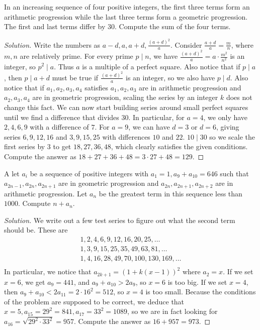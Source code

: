 \begin{prb}[2003 AIME I-8]
In an increasing sequence of four positive integers, the first three terms form
an arithmetic progression while the last three terms form a geometric
progression. The first and last terms differ by $30$. Compute the sum of the
four terms.
\end{prb}

\ifsolutions
\begin{proof}[Solution]
Write the numbers as $a - d, a, a + d, \frac{(a + d)^2}{a}$. Consider $\frac{a +
d}{a} = \frac{m}{n}$, where $m, n$ are relatively prime. For every prime $p \mid
n$, we have $\frac{(a + d)^2}{a} = a \cdot \frac{m^2}{n^2}$ is an integer, so
$p^2 \mid a$. Thus $a$ is a multiple of a perfect square. Also notice that if $p
\mid a$, then $p \mid a + d$ must be true if $\frac{(a + d)^2}{a}$ is an
integer, so we also have $p \mid d$. Also notice that if $a_1, a_2, a_3, a_4$
satisfies $a_1, a_2, a_3$ are in arithmetic progression and $a_2, a_3, a_4$ are
in geometric progression, scaling the series by an integer $k$ does not change
this fact. We can now start building series around small perfect squares until
we find a difference that divides $30$. In particular, for $a = 4$, we only have
$2, 4, 6, 9$ with a difference of $7$. For $a = 9$, we can have $d = 3$ or $d =
6$, giving series $6, 9, 12, 16$ and $3, 9, 15, 25$ with differences $10$ and
$22$. $10 \mid 30$ so we scale the first series by $3$ to get $18, 27, 36, 48$,
which clearly satisfies the given conditions. Compute the answer as $18 + 27 +
36 + 48 = 3 \cdot 27 + 48 = \boxed{129}$.
\end{proof}
\fi

\begin{prb}[2004 AIME II-9]
A let $a_i$ be a sequence of positive integers with $a_1 = 1, a_9 + a_{10} =
646$ such that $a_{2n - 1}, a_{2n}, a_{2n + 1}$ are in geometric progression and
$a_{2n}, a_{2n + 1}, a_{2n + 2}$ are in arithmetic progression. Let $a_n$ be the
greatest term in this sequence less than $1000$. Compute $n + a_n$.
\end{prb}

\ifsolutions
\begin{proof}[Solution]
We write out a few test series to figure out what the second term should be.
These are
\[ \begin{aligned}
1, 2, 4, 6, 9, 12, 16, 20, 25, \dots \\
1, 3, 9, 15, 25, 35, 49, 63, 81, \dots \\
1, 4, 16, 28, 49, 70, 100, 130, 169, \dots \\
\end{aligned} \]
In particular, we notice that $a_{2k + 1} = (1 + k(x - 1))^2$ where $a_2 = x$.
If we set $x = 6$, we get $a_9 = 441$, and $a_9 + a_{10} > 2 a_9$, so $x = 6$ is
too big. If we set $x = 4$, then $a_9 + a_{10} < 2 a_{11} = 2 \cdot 16^2 = 512$,
so $x = 4$ is too small. Because the conditions of the problem are supposed to
be correct, we deduce that $x = 5, a_{15} = 29^2 = 841, a_{17} = 33^2 = 1089$,
so we are in fact looking for $a_{16} = \sqrt{29^2 \cdot 33^2} = 957$. Compute the
answer as $16 + 957 = \boxed{973}$.
\end{proof}
\fi

